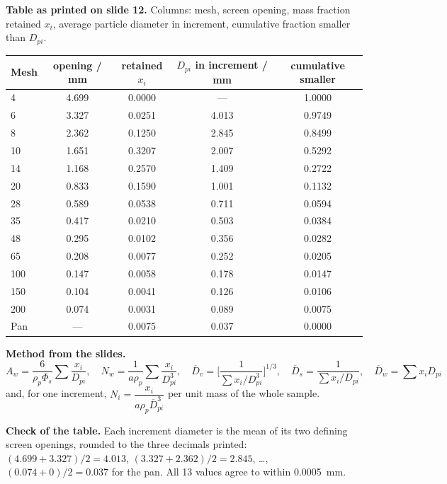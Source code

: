 \documentclass[10pt,a4paper]{article}
\newcommand{\spsub}[1]{\par\addvspace{7pt}\noindent{\color{accent}\bfseries #1}\par\addvspace{3pt}\nopagebreak}
\begin{document}
\begin{qbox}
\textbf{Table as printed on slide 12.} Columns: mesh, screen opening, mass fraction retained $x_i$,
average particle diameter in increment, cumulative fraction smaller than $D_{pi}$.
\begin{center}\footnotesize
\begin{tabular}{@{}l S[table-format=1.3] S[table-format=1.4] S[table-format=1.3] S[table-format=1.4]@{}}
\toprule
{Mesh} & {opening / \si{\milli\meter}} & {retained $x_i$} & {$D_{pi}$ in increment / \si{\milli\meter}} & {cumulative smaller}\\
 & 4.699 & 0.0000 & {---} & 1.0000\\
6 & 3.327 & 0.0251 & 4.013 & 0.9749\\
8 & 2.362 & 0.1250 & 2.845 & 0.8499\\
10 & 1.651 & 0.3207 & 2.007 & 0.5292\\
14 & 1.168 & 0.2570 & 1.409 & 0.2722\\
20 & 0.833 & 0.1590 & 1.001 & 0.1132\\
28 & 0.589 & 0.0538 & 0.711 & 0.0594\\
35 & 0.417 & 0.0210 & 0.503 & 0.0384\\
48 & 0.295 & 0.0102 & 0.356 & 0.0282\\
65 & 0.208 & 0.0077 & 0.252 & 0.0205\\
100 & 0.147 & 0.0058 & 0.178 & 0.0147\\
150 & 0.104 & 0.0041 & 0.126 & 0.0106\\
200 & 0.074 & 0.0031 & 0.089 & 0.0075\\
Pan & {---} & 0.0075 & 0.037 & 0.0000\\
\bottomrule
\end{tabular}
\end{center}
\end{qbox}

\begin{mthbox}
\textbf{Method from the slides.}
\[
A_w=\frac{6}{\rho_p\Phi_s}\sum\frac{x_i}{D_{pi}},\quad
N_w=\frac{1}{a\rho_p}\sum\frac{x_i}{D_{pi}^3},\quad
\overline{D}_v=\Big[\frac{1}{\sum x_i/D_{pi}^3}\Big]^{1/3},\quad
\overline{D}_s=\frac{1}{\sum x_i/D_{pi}},\quad
\overline{D}_w=\sum x_iD_{pi}
\]
and, for one increment, $N_i=\dfrac{x_i}{a\rho_p\overline{D}_{pi}^{3}}$ per unit mass of the whole sample.
\end{mthbox}

\spsub{Solution}
\textbf{Check of the table.} Each increment diameter is the mean of its two defining screen openings,
rounded to the three decimals printed: $(4.699+3.327)/2=4.013$, $(3.327+2.362)/2=2.845$, \dots,
$(0.074+0)/2=0.037$ for the pan. All 13 values agree to within \SI{0.0005}{\milli\meter}.
\end{document}

